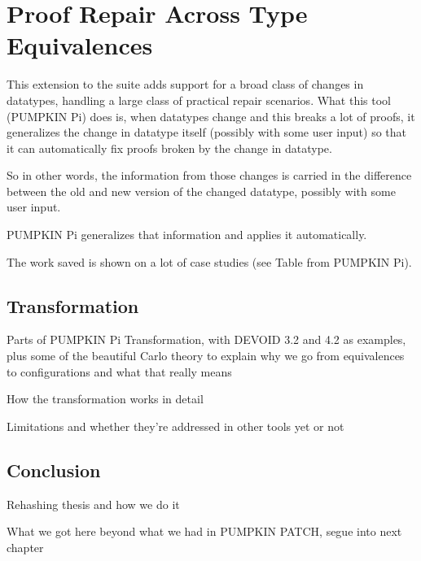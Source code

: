 \chapter{Proof Repair Across Type Equivalences}
\label{chapt:pi}

This extension to the suite adds support for a broad class of changes in datatypes, handling a large class of practical repair scenarios.
What this tool (PUMPKIN Pi) does is, when datatypes change and this breaks a lot of proofs, it generalizes the change in datatype itself (possibly with some user input) so that it can automatically fix proofs broken by the change in datatype. 

So in other words, the information from those changes is carried in the difference between the old and new version of the changed datatype, possibly with some user input.

PUMPKIN Pi generalizes that information and applies it automatically.

The work saved is shown on a lot of case studies (see Table from PUMPKIN Pi).







\section{Transformation}

Parts of PUMPKIN Pi Transformation, with DEVOID 3.2 and 4.2 as examples, plus some of the beautiful Carlo theory to explain why we go from equivalences to configurations and what that really means

How the transformation works in detail

Limitations and whether they're addressed in other tools yet or not





\section{Conclusion}

Rehashing thesis and how we do it

What we got here beyond what we had in PUMPKIN PATCH, segue into next chapter


